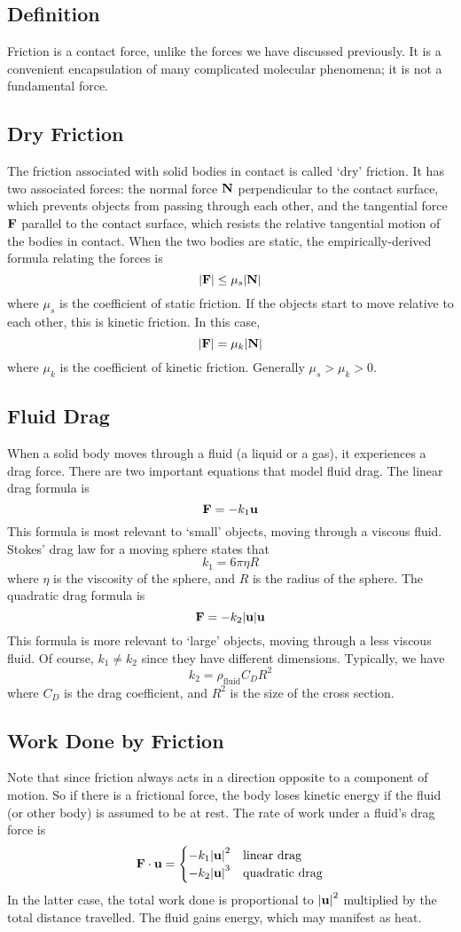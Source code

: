 \subsection{Definition}
Friction is a contact force, unlike the forces we have discussed previously. It is a convenient encapsulation of many complicated molecular phenomena; it is not a fundamental force.

\subsection{Dry Friction}
The friction associated with solid bodies in contact is called `dry' friction. It has two associated forces: the normal force $\vb N$ perpendicular to the contact surface, which prevents objects from passing through each other, and the tangential force $\vb F$ parallel to the contact surface, which resists the relative tangential motion of the bodies in contact. When the two bodies are static, the empirically-derived formula relating the forces is
\[ \abs{\vb F} \leq \mu_s \abs{\vb N} \]
where $\mu_s$ is the coefficient of static friction. If the objects start to move relative to each other, this is kinetic friction. In this case,
\[ \abs{\vb F} = \mu_k \abs{\vb N} \]
where $\mu_k$ is the coefficient of kinetic friction. Generally $\mu_s > \mu_k > 0$.

\subsection{Fluid Drag}
When a solid body moves through a fluid (a liquid or a gas), it experiences a drag force. There are two important equations that model fluid drag. The linear drag formula is
\[ \vb F = -k_1 \vb u \]
This formula is most relevant to `small' objects, moving through a viscous fluid. Stokes' drag law for a moving sphere states that
\[ k_1 = 6 \pi \eta R \]
where $\eta$ is the viscosity of the sphere, and $R$ is the radius of the sphere. The quadratic drag formula is
\[ \vb F = -k_2 \abs{\vb u} \vb u \]
This formula is more relevant to `large' objects, moving through a less viscous fluid. Of course, $k_1 \neq k_2$ since they have different dimensions. Typically, we have
\[ k_2 = \rho_{\text{fluid}} C_D R^2 \]
where $C_D$ is the drag coefficient, and $R^2$ is the size of the cross section.

\subsection{Work Done by Friction}
Note that since friction always acts in a direction opposite to a component of motion. So if there is a frictional force, the body loses kinetic energy if the fluid (or other body) is assumed to be at rest. The rate of work under a fluid's drag force is
\[ \vb F \cdot \vb u = \begin{cases}
		-k_1 \abs{\vb u}^2 & \text{linear drag}    \\
		-k_2 \abs{\vb u}^3 & \text{quadratic drag}
	\end{cases} \]
In the latter case, the total work done is proportional to $\abs{\vb u}^2$ multiplied by the total distance travelled. The fluid gains energy, which may manifest as heat.

